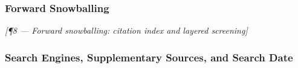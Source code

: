\subsubsection{Forward Snowballing}
\label{sec:methodology:snowballing:forward}


\bigskip\noindent\textit{[¶8 — Forward snowballing: citation index and layered screening]}

\subsubsection{Search Engines, Supplementary Sources, and Search Date}
\label{sec:methodology:snowballing:engines}


